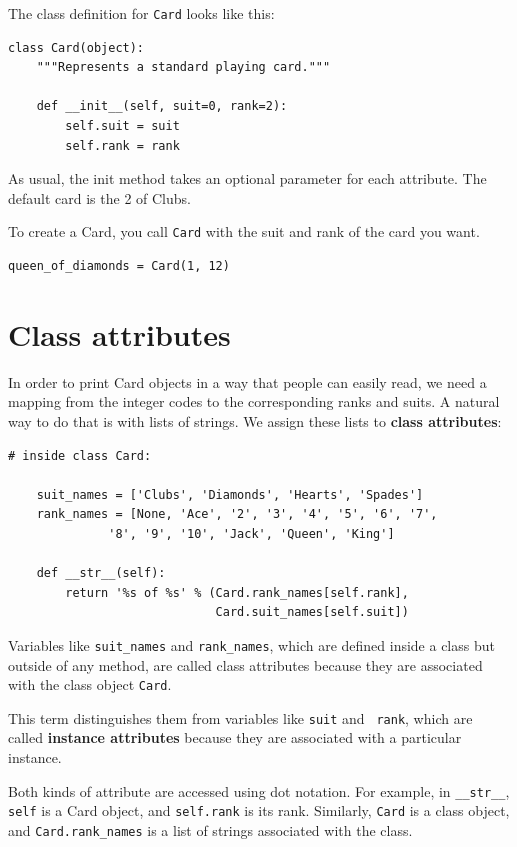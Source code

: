 \documentclass[10pt]{book}
\begin{document}
\begin{CJK}{UTF8}{gbsn}
The class definition for {\tt Card} looks like this:

\begin{verbatim}
class Card(object):
    """Represents a standard playing card."""

    def __init__(self, suit=0, rank=2):
        self.suit = suit
        self.rank = rank
\end{verbatim}
%
As usual, the init method takes an optional
parameter for each attribute.  The default card is
the 2 of Clubs.

To create a Card, you call {\tt Card} with the
suit and rank of the card you want.

\begin{verbatim}
queen_of_diamonds = Card(1, 12)
\end{verbatim}
%


\section{Class attributes}
\label{class.attribute}

In order to print Card objects in a way that people can easily
read, we need a mapping from the integer codes to the corresponding
ranks and suits.  A natural way to
do that is with lists of strings.  We assign these lists to {\bf class
attributes}:

\begin{verbatim}
# inside class Card:

    suit_names = ['Clubs', 'Diamonds', 'Hearts', 'Spades']
    rank_names = [None, 'Ace', '2', '3', '4', '5', '6', '7', 
              '8', '9', '10', 'Jack', 'Queen', 'King']

    def __str__(self):
        return '%s of %s' % (Card.rank_names[self.rank],
                             Card.suit_names[self.suit])
\end{verbatim}
%
Variables like \verb"suit_names" and \verb"rank_names", which are
defined inside a class but outside of any method, are called
class attributes because they are associated with the class object 
{\tt Card}.

This term distinguishes them from variables like {\tt suit} and {\tt
  rank}, which are called {\bf instance attributes} because they are
associated with a particular instance.

Both kinds of attribute are accessed using dot notation.  For
example, in \verb"__str__", {\tt self} is a Card object,
and {\tt self.rank} is its rank.  Similarly, {\tt Card}
is a class object, and \verb"Card.rank_names" is a
list of strings associated with the class.


\end{CJK}
\end{document}

